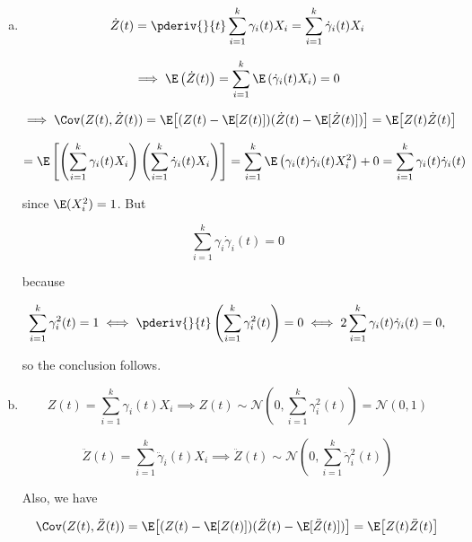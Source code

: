 \begin{solution}

\begin{enumerate}[(a)]

\item

\[
\dot{Z}(t) =  \pderiv{}{t} \sum_{i=1}^k \gamma_i(t) X_i =   \sum_{i=1}^k   \dot{\gamma}_i(t) X_i 
\]

\[
\implies \E \left( \dot{Z}(t)  \right) =    \sum_{i=1}^k   \E \left( \dot{\gamma}_i(t) X_i \right) = 0
\]

\[
\implies \Cov(Z(t), \dot{Z}(t)) = \E \big[ (Z(t) - \E[ Z(t)])(\dot{Z}(t)  - \E[\dot{Z}(t) ]) \big]  = \E \big[ Z(t) \dot{Z}(t)  \big]  
\]

\[
= \E \left[  \left(  \sum_{i=1}^k \gamma_i(t) X_i   \right) \left( \sum_{i=1}^k   \dot{\gamma}_i(t) X_i  \right)  \right] = \sum_{i=1}^k \E \left( \gamma_i(t)  \dot{\gamma}_i(t)  X_i^2 \right) + 0 = \sum_{i=1}^k \gamma_i(t)  \dot{\gamma}_i(t) 
\]

since \(\E(X_i^2) = 1\). But 

\begin{equation}\label{2017.screen.1.a.deriv.id}
\sum_{i=1}^k \gamma_i \dot{\gamma}_i(t) = 0 
\end{equation}

because

\[
\sum_{i=1}^k \gamma_i^2(t) = 1 \iff  \pderiv{}{t} \left( \sum_{i=1}^k \gamma_i^2(t) \right) = 0 \iff 2 \sum_{i=1}^k \gamma_i(t) \dot{\gamma}_i(t) = 0,
\]

so the conclusion follows.

\item

\[
Z(t) =  \sum_{i=1}^k   \gamma_i(t)  X_i \implies Z(t) \sim \mathcal{N} \left(0, \sum_{i=1}^k \gamma_i^2(t)  \right) = \mathcal{N} \left(0,1 \right)
\]

\[
\ddot{Z}(t) =  \sum_{i=1}^k   \ddot{\gamma}_i(t)  X_i \implies \ddot{Z}(t) \sim \mathcal{N} \left(0, \sum_{i=1}^k \ddot{\gamma}_i^2(t)  \right)
\]

Also, we have

%


\[
\Cov(Z(t), \ddot{Z}(t)) = \E \big[ (Z(t) - \E[ Z(t)])(\ddot{Z}(t)  - \E[\ddot{Z}(t) ]) \big]  = \E \big[ Z(t) \ddot{Z}(t)  \big]  
\]


\end{enumerate}
\end{solution}
